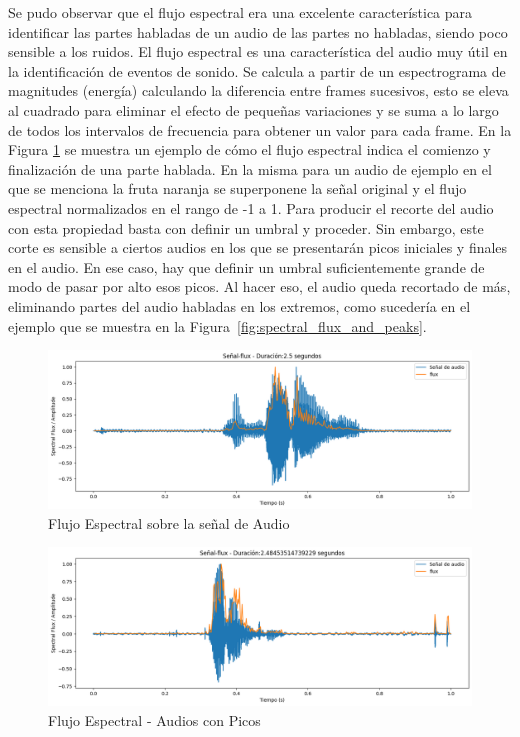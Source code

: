 \documentclass[a4paper, 12pt]{article}
\begin{document}
Se pudo observar que el flujo espectral era una excelente característica para identificar las partes habladas de un audio de las partes no habladas, siendo poco sensible a los ruidos. El flujo espectral es una característica del audio muy útil en la identificación de eventos de sonido. Se calcula a partir de un espectrograma de magnitudes (energía) calculando la diferencia entre frames sucesivos, esto se eleva al cuadrado para eliminar el efecto de pequeñas variaciones y se suma a lo largo de todos los intervalos de frecuencia para obtener un valor para cada frame.
En la Figura \ref{spectral flux} se muestra un ejemplo de cómo el flujo espectral indica el comienzo y finalización de una parte hablada. En la misma para un audio de ejemplo en el que se menciona la fruta naranja se superponene la señal original y el flujo espectral normalizados en el rango de -1 a 1.
Para producir el recorte del audio con esta propiedad basta con definir un umbral y proceder. Sin embargo, este corte es sensible a ciertos audios en los que se presentarán picos iniciales y finales en el audio. En ese caso, hay que definir un umbral suficientemente grande de modo de pasar por alto esos picos. Al hacer eso, el audio queda recortado de más, eliminando partes del audio habladas en los extremos, como sucedería en el ejemplo que se muestra en la Figura~\ref{fig:spectral_flux_and_peaks}.

\begin{figure}[h]
    \centering
    \includegraphics[width=0.8\linewidth]{trimming1.png}
    \caption{Flujo Espectral sobre la señal de Audio}
    \label{spectral flux}
\end{figure}

\begin{figure}[h]
    \centering
    \includegraphics[width=0.8\linewidth]{trimming2.png}
    \caption{Flujo Espectral - Audios con Picos}
    \label{spectral flux and peaks}
\end{figure}
\end{document}

